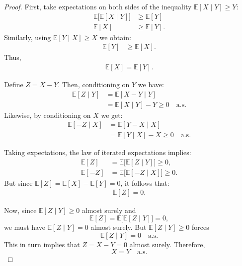 \documentclass[letterpaper, 11pt]{article}
\newcommand{\1}{\mathds{1}}	%
\theoremstyle{definition}
\begin{document}
\begin{proof}
    First, take expectations on both sides of the inequality \(\mathbb{E}[X \mid Y] \ge Y\):
\begin{align*}
\mathbb{E}\bigl[\mathbb{E}[X \mid Y]\bigr] &\ge \mathbb{E}[Y] \\
\mathbb{E}[X] &\ge \mathbb{E}[Y].
\end{align*}
Similarly, using \(\mathbb{E}[Y \mid X] \ge X\) we obtain:
\begin{align*}
\mathbb{E}[Y] &\ge \mathbb{E}[X].
\end{align*}
Thus,
\begin{align*}
\mathbb{E}[X] = \mathbb{E}[Y].
\end{align*}

Define \(Z = X - Y\). Then, conditioning on \(Y\) we have:
\begin{align*}
\mathbb{E}[Z \mid Y] &= \mathbb{E}[X - Y \mid Y] \\
&= \mathbb{E}[X \mid Y] - Y \ge 0 \quad \text{a.s.}
\end{align*}
Likewise, by conditioning on \(X\) we get:
\begin{align*}
\mathbb{E}[-Z \mid X] &= \mathbb{E}[Y - X \mid X] \\
&= \mathbb{E}[Y \mid X] - X \ge 0 \quad \text{a.s.}
\end{align*}

Taking expectations, the law of iterated expectations implies:
\begin{align*}
\mathbb{E}[Z] &= \mathbb{E}\bigl[\mathbb{E}[Z \mid Y]\bigr] \ge 0, \\
\mathbb{E}[-Z] &= \mathbb{E}\bigl[\mathbb{E}[-Z \mid X]\bigr] \ge 0.
\end{align*}
But since \(\mathbb{E}[Z] = \mathbb{E}[X] - \mathbb{E}[Y] = 0\), it follows that:
\begin{align*}
\mathbb{E}[Z] = 0.
\end{align*}

Now, since \(\mathbb{E}[Z \mid Y] \ge 0\) almost surely and
\[
\mathbb{E}[Z] = \mathbb{E}\bigl[\mathbb{E}[Z \mid Y]\bigr] = 0,
\]
we must have \(\mathbb{E}[Z \mid Y] = 0\) almost surely. But \(\mathbb{E}[Z \mid Y] \ge 0\) forces
\[
\mathbb{E}[Z \mid Y] = 0 \quad \text{a.s.}
\]
This in turn implies that \(Z = X - Y = 0\) almost surely. Therefore,
\[
X = Y \quad \text{a.s.}
\]
\end{proof}
\end{document}
